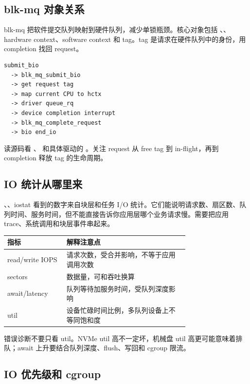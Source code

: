 \subsection{blk-mq 对象关系}

blk-mq 把软件提交队列映射到硬件队列，减少单锁瓶颈。核心对象包括 、、hardware context、software context 和 tag。tag 是请求在硬件队列中的身份，用 completion 找回 request。

\begin{lstlisting}
submit_bio
  -> blk_mq_submit_bio
  -> get request tag
  -> map current CPU to hctx
  -> driver queue_rq
  -> device completion interrupt
  -> blk_mq_complete_request
  -> bio end_io
\end{lstlisting}

读源码看 、 和具体驱动的 。关注 request 从 free tag 到 in-flight，再到 completion 释放 tag 的生命周期。

\subsection{IO 统计从哪里来}

、、iostat 看到的数字来自块层和任务 I/O 统计。它们能说明请求数、扇区数、队列时间、服务时间，但不能直接告诉你应用层哪个业务请求慢。需要把应用 trace、系统调用和块层事件串起来。

\begin{longtable}{|p{0.22\linewidth}|p{0.52\linewidth}|}
\toprule
指标 & 解释注意点 \\
\midrule
read/write IOPS & 请求次数，受合并影响，不等于应用调用次数 \\\tablerowrule
sectors & 数据量，可和吞吐换算 \\\tablerowrule
await/latency & 队列等待加服务时间，受队列深度影响 \\\tablerowrule
util & 设备忙碌时间比例，多队列设备上不等同饱和度 \\
\bottomrule
\end{longtable}

错误诊断不要只看 util。NVMe util 高不一定坏，机械盘 util 高更可能意味着排队；await 上升要结合队列深度、flush、写回和 cgroup 限流。

\subsection{IO 优先级和 cgroup}

